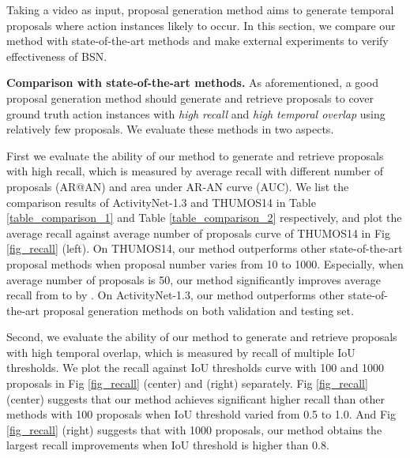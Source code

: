 \documentclass[runningheads]{llncs}
\begin{document}
Taking a video as input, proposal generation method aims to generate temporal proposals where action instances likely to occur. In this section, we compare our method with state-of-the-art methods and  make external experiments to verify effectiveness of BSN.

\noindent
{\bf Comparison with state-of-the-art methods.}
As aforementioned, a good proposal generation method should generate and retrieve proposals to cover ground truth action instances with \emph{high recall} and \emph{high temporal overlap}  using relatively few proposals. We evaluate these methods in two aspects.
 
First we evaluate the ability of our method to generate and retrieve proposals with high recall, which is measured by average recall with different number  of proposals (AR@AN) and area under AR-AN curve (AUC). We list the comparison results of ActivityNet-1.3 and THUMOS14 in Table \ref{table_comparison_1} and Table \ref{table_comparison_2} respectively, and plot the average recall against average number of proposals curve of THUMOS14 in Fig \ref{fig_recall} (left).
On THUMOS14, our method outperforms other state-of-the-art proposal methods when proposal number varies from 10 to 1000. Especially, when average number of proposals is 50, our method significantly improves average recall from  to  by . On ActivityNet-1.3, our method outperforms other state-of-the-art proposal generation methods on both validation and testing set. 



Second, we evaluate the ability of our method to generate and retrieve proposals with high temporal overlap, which is measured by recall of multiple IoU thresholds. 
We plot the recall against IoU thresholds curve with 100 and 1000 proposals in Fig \ref{fig_recall} (center) and (right) separately.
Fig \ref{fig_recall} (center) suggests that our method achieves significant higher recall than other methods with 100 proposals when IoU threshold varied from 0.5 to 1.0. 
 And Fig \ref{fig_recall} (right) suggests that with 1000 proposals, our method obtains the largest recall improvements when IoU threshold is higher than 0.8. 
\end{document}
